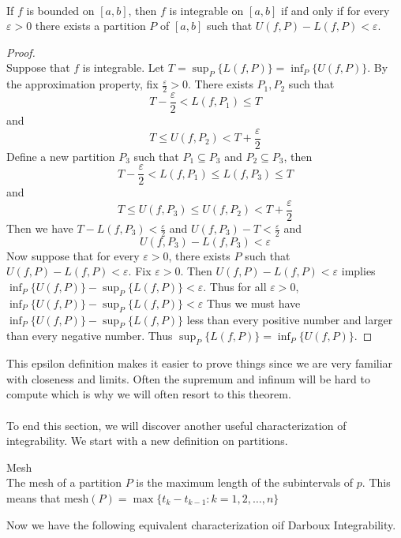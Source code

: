 \documentclass[a4paper]{article}
\begin{document}
\begin{thm}{}{}\\ If $f$ is bounded on $[a,b]$, then $f$ is integrable on $[a,b]$ if and only if for every $\varepsilon>0$ there exists a partition $P$ of $[a,b]$ such that $U(f,P)-L(f,P)<\varepsilon$. 
\begin{proof}\\ Suppose that $f$ is integrable. Let $T=\sup_P\{L(f,P)\}=\inf_P\{U(f,P)\}$. By the approximation property, fix $\frac{\varepsilon}{2}>0$. There exists $P_1,P_2$ such that $$T-\frac{\varepsilon}{2}<L(f,P_1)\leq T$$ and $$T\leq U(f,P_2)<T+\frac{\varepsilon}{2}$$ Define a new partition $P_3$ such that $P_1\subseteq P_3$ and $P_2\subseteq P_3$, then $$T-\frac{\varepsilon}{2}<L(f,P_1)\leq L(f,P_3)\leq T$$ and $$T\leq U(f,P_3)\leq U(f,P_2)<T+\frac{\varepsilon}{2}$$ Then we have $T-L(f,P_3)<\frac{\varepsilon}{2}$ and $U(f,P_3)-T<\frac{\varepsilon}{2}$ and $$U(f,P_3)-L(f,P_3)<\varepsilon$$
Now suppose that for every $\varepsilon>0$, there exists $P$ such that $U(f,P)-L(f,P)<\varepsilon$. Fix $\varepsilon>0$. Then $U(f,P)-L(f,P)<\varepsilon$ implies $\inf_P\{U(f,P)\}-\sup_P\{L(f,P)\}<\varepsilon$. Thus for all $\varepsilon>0$, $\inf_P\{U(f,P)\}-\sup_P\{L(f,P)\}<\varepsilon$ Thus we must have $\inf_P\{U(f,P)\}-\sup_P\{L(f,P)\}$ less than every positive number and larger than every negative number. Thus $\sup_P\{L(f,P)\}=\inf_P\{U(f,P)\}$. 
\end{proof}
\end{thm}

This epsilon definition makes it easier to prove things since we are very familiar with closeness and limits. Often the supremum and infinum will be hard to compute which is why we will often resort to this theorem. \\~\\
To end this section, we will discover another useful characterization of integrability. We start with a new definition on partitions. 

\begin{defn}{Mesh}{}\\ The mesh of a partition $P$ is the maximum length of the subintervals of $p$. This means that $\text{mesh}(P)=\max\{t_k-t_{k-1}:k=1,2,\dots,n\}$
\end{defn}

Now we have the following equivalent characterization oif Darboux Integrability. 
\end{document}

